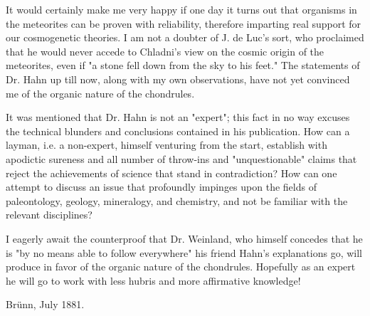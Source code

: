 \documentclass[a4paper, 12pt, oneside]{article}
\begin{document}
It would certainly make me very happy if one day it turns out that organisms in the meteorites can be proven with reliability, therefore imparting real support for our cosmogenetic theories. I am not a doubter of J. de Luc's sort, who proclaimed that he would never accede to Chladni's view on the cosmic origin of the meteorites, even if "a stone fell down from the sky to his feet." The statements of Dr. Hahn up till now, along with my own observations, have not yet convinced me of the organic nature of the chondrules.

It was mentioned that Dr. Hahn is not an "expert"; this fact in no way excuses the technical blunders and conclusions contained in his publication. How can a layman, i.e. a non-expert, himself venturing from the start, establish with apodictic sureness and all number of throw-ins and "unquestionable" claims that reject the achievements of science that stand in contradiction? How can one attempt to discuss an issue that profoundly impinges upon the fields of paleontology, geology, mineralogy, and chemistry, and not be familiar with the relevant disciplines?

I eagerly await the counterproof that Dr. Weinland, who himself concedes that he is "by no means able to follow everywhere" his friend Hahn's explanations go, will produce in favor of the organic nature of the chondrules. Hopefully as an expert he will go to work with less hubris and more affirmative knowledge!

Brünn, July 1881.
\end{document}
